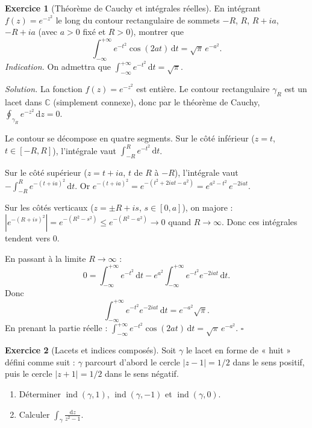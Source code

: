 \documentclass[12pt,a4paper,openany]{book}
\theoremstyle{definition}
\newtheorem{exercice}{Exercice}[chapter]
\theoremstyle{plain}
\theoremstyle{remark}
\newcommand{\C}{\mathbb{C}}
\DeclareMathOperator{\ind}{ind}
\newcommand{\dd}{\mathrm{d}}
\newcommand{\abs}[1]{\left|#1\right|}
\begin{document}
\bigskip

\begin{exercice}[Théorème de Cauchy et intégrales réelles]\label{exo:cauchy-integrale-reelle}
En intégrant $f(z) = e^{-z^2}$ le long du contour rectangulaire de sommets
$-R$, $R$, $R+ia$, $-R+ia$ (avec $a > 0$ fixé et $R > 0$), montrer que
\[
  \int_{-\infty}^{+\infty} e^{-t^2}\cos(2at)\,\dd t = \sqrt{\pi}\,e^{-a^2}.
\]
\noindent\textit{Indication.} On admettra que
$\int_{-\infty}^{+\infty} e^{-t^2}\,\dd t = \sqrt{\pi}$.
\end{exercice}

\noindent\textit{Solution.}\enspace
La fonction $f(z) = e^{-z^2}$ est entière. Le contour rectangulaire $\gamma_R$
est un lacet dans $\C$ (simplement connexe), donc par le théorème de Cauchy,
$\oint_{\gamma_R} e^{-z^2}\,\dd z = 0$.

Le contour se décompose en quatre segments. Sur le côté inférieur ($z = t$,
$t \in [-R,R]$), l'intégrale vaut $\int_{-R}^R e^{-t^2}\,\dd t$.

Sur le côté supérieur ($z = t + ia$, $t$ de $R$ à $-R$), l'intégrale vaut
$-\int_{-R}^R e^{-(t+ia)^2}\,\dd t$. Or
$e^{-(t+ia)^2} = e^{-(t^2+2iat-a^2)} = e^{a^2-t^2}\,e^{-2iat}$.

Sur les côtés verticaux ($z = \pm R + is$, $s \in [0,a]$), on majore :
$\abs{e^{-(R+is)^2}} = e^{-(R^2-s^2)} \leq e^{-(R^2-a^2)} \to 0$ quand
$R \to \infty$. Donc ces intégrales tendent vers $0$.

En passant à la limite $R \to \infty$ :
\[
  0 = \int_{-\infty}^{+\infty} e^{-t^2}\,\dd t
    - e^{a^2}\int_{-\infty}^{+\infty} e^{-t^2}e^{-2iat}\,\dd t.
\]
Donc
\[
  \int_{-\infty}^{+\infty} e^{-t^2}e^{-2iat}\,\dd t = e^{-a^2}\sqrt{\pi}.
\]
En prenant la partie réelle :
$\int_{-\infty}^{+\infty} e^{-t^2}\cos(2at)\,\dd t = \sqrt{\pi}\,e^{-a^2}$.
\hfill$\square$

\bigskip

\begin{exercice}[Lacets et indices composés]\label{exo:lacets-composes}
Soit $\gamma$ le lacet en forme de « huit » défini comme suit : $\gamma$
parcourt d'abord le cercle $\abs{z-1} = 1/2$ dans le sens positif, puis le
cercle $\abs{z+1} = 1/2$ dans le sens négatif.
\begin{enumerate}[label=\textup{(\alph*)}]
  \item Déterminer $\ind(\gamma, 1)$, $\ind(\gamma, -1)$ et $\ind(\gamma, 0)$.
  \item Calculer $\displaystyle\int_\gamma \frac{\dd z}{z^2-1}$.
\end{enumerate}
\end{exercice}
\end{document}
